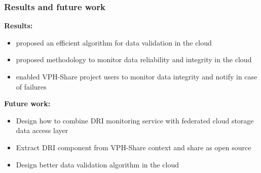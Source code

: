 \documentclass[9pt]{beamer}
\begin{document}
\begin{frame}
\frametitle{\hspace{5mm} \textbf{Results and future work}}
\begin{block}{}
\textbf{Results:}
\begin{itemize}
	\item proposed an efficient algorithm for data validation in the cloud
	\item proposed methodology to monitor data reliability and integrity in the cloud
	\item enabled VPH-Share project users to monitor data integrity and notify in case of failures
\end{itemize}
\end{block}
\begin{block}{}
\textbf{Future work:}
\begin{itemize}
	\item Design how to combine DRI monitoring service with federated cloud storage data access layer
	\item Extract DRI component from VPH-Share context and share as open source
	\item Design better data validation algorithm in the cloud
\end{itemize}
\end{block}
\end{frame}
\end{document}
